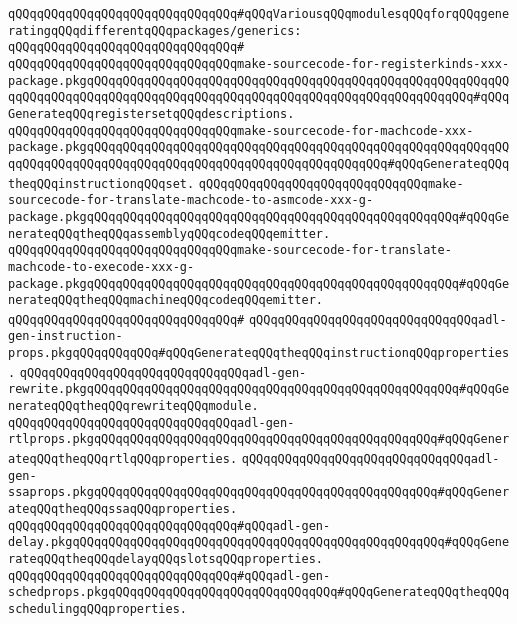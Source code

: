 \newline
\verb|qQQqqQQqqQQqqQQqqQQqqQQqqQQqqQQq#qQQqVariousqQQqmodulesqQQqforqQQqgeneratingqQQqdifferentqQQqpackages/generics:|\newline
\verb|qQQqqQQqqQQqqQQqqQQqqQQqqQQqqQQq#|\newline
\verb|qQQqqQQqqQQqqQQqqQQqqQQqqQQqqQQqmake-sourcecode-for-registerkinds-xxx-package.pkgqQQqqQQqqQQqqQQqqQQqqQQqqQQqqQQqqQQqqQQqqQQqqQQqqQQqqQQqqQQqqQQqqQQqqQQqqQQqqQQqqQQqqQQqqQQqqQQqqQQqqQQqqQQqqQQqqQQqqQQqqQQq#qQQqGenerateqQQqregistersetqQQqdescriptions.|\newline
\verb|qQQqqQQqqQQqqQQqqQQqqQQqqQQqqQQqmake-sourcecode-for-machcode-xxx-package.pkgqQQqqQQqqQQqqQQqqQQqqQQqqQQqqQQqqQQqqQQqqQQqqQQqqQQqqQQqqQQqqQQqqQQqqQQqqQQqqQQqqQQqqQQqqQQqqQQqqQQqqQQqqQQqqQQq#qQQqGenerateqQQqtheqQQqinstructionqQQqset.|\newline
\verb|qQQqqQQqqQQqqQQqqQQqqQQqqQQqqQQqmake-sourcecode-for-translate-machcode-to-asmcode-xxx-g-package.pkgqQQqqQQqqQQqqQQqqQQqqQQqqQQqqQQqqQQqqQQqqQQqqQQqqQQq#qQQqGenerateqQQqtheqQQqassemblyqQQqcodeqQQqemitter.|\newline
\verb|qQQqqQQqqQQqqQQqqQQqqQQqqQQqqQQqmake-sourcecode-for-translate-machcode-to-execode-xxx-g-package.pkgqQQqqQQqqQQqqQQqqQQqqQQqqQQqqQQqqQQqqQQqqQQqqQQqqQQq#qQQqGenerateqQQqtheqQQqmachineqQQqcodeqQQqemitter.|\newline
\verb|qQQqqQQqqQQqqQQqqQQqqQQqqQQqqQQq#|\newline
\verb|qQQqqQQqqQQqqQQqqQQqqQQqqQQqqQQqadl-gen-instruction-props.pkgqQQqqQQqqQQq#qQQqGenerateqQQqtheqQQqinstructionqQQqproperties.|\newline
\verb|qQQqqQQqqQQqqQQqqQQqqQQqqQQqqQQqadl-gen-rewrite.pkgqQQqqQQqqQQqqQQqqQQqqQQqqQQqqQQqqQQqqQQqqQQqqQQqqQQq#qQQqGenerateqQQqtheqQQqrewriteqQQqmodule.|\newline
\verb|qQQqqQQqqQQqqQQqqQQqqQQqqQQqqQQqadl-gen-rtlprops.pkgqQQqqQQqqQQqqQQqqQQqqQQqqQQqqQQqqQQqqQQqqQQqqQQq#qQQqGenerateqQQqtheqQQqrtlqQQqproperties.|\newline
\verb|qQQqqQQqqQQqqQQqqQQqqQQqqQQqqQQqadl-gen-ssaprops.pkgqQQqqQQqqQQqqQQqqQQqqQQqqQQqqQQqqQQqqQQqqQQqqQQq#qQQqGenerateqQQqtheqQQqssaqQQqproperties.|\newline
\verb|qQQqqQQqqQQqqQQqqQQqqQQqqQQqqQQq#qQQqadl-gen-delay.pkgqQQqqQQqqQQqqQQqqQQqqQQqqQQqqQQqqQQqqQQqqQQqqQQqqQQq#qQQqGenerateqQQqtheqQQqdelayqQQqslotsqQQqproperties.|\newline
\verb|qQQqqQQqqQQqqQQqqQQqqQQqqQQqqQQq#qQQqadl-gen-schedprops.pkgqQQqqQQqqQQqqQQqqQQqqQQqqQQqqQQq#qQQqGenerateqQQqtheqQQqschedulingqQQqproperties.|\newline

